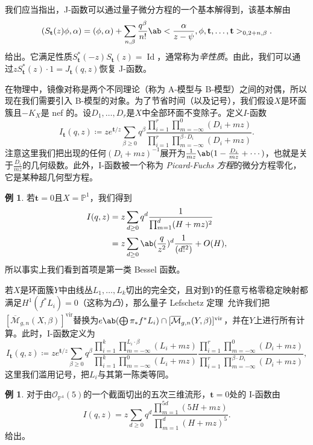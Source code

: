 \documentclass{amsart}
\theoremstyle{definition}
\newtheorem{exm}[thm]{例}
\theoremstyle{remark}
\theoremstyle{plain}
\theoremstyle{definition}
\theoremstyle{remark}
\renewcommand{\P}{\mathbb{P}}
\newcommand{\Mbar}{\overline{\mathcal{M}}}
\newcommand{\mc}[1]{\mathcal{#1}}
\newcommand{\mbf}[1]{\mathbf{#1}}
\newcommand{\mr}[1]{\mathrm{#1}}
\newcommand{\on}[1]{\operatorname{#1}}
\newcommand{\1}{\mathbf{1}}
\newcommand{\2}{\mathbf{2}}
\newcommand{\3}{\mathbf{3}}
\newcommand{\vir}{\mr{vir}}
\begin{document}
我们应当指出，J-函数可以通过量子微分方程的一个基本解得到，该基本解由
\[ ( S_{\mbf{t}}(z) \phi , \alpha) = (\phi, \alpha) + \sum_{n, \beta} \frac{q^{\beta}}{n!} \ab<\frac{\alpha}{z-\psi}, \phi, \mbf{t}, \ldots, \mbf{t}>_{0, 2+n, \beta}. \]
给出。它满足性质\(S_{\mbf{t}}^*(-z) S_{\mbf{t}}(z) = \on{Id}\)，通常称为\textit{辛性质}。由此，我们可以通过\(z S_{\mbf{t}}^*(z)\cdot 1 = J_{\mbf{t}}(q, z)\)恢复 J-函数。

在物理中，镜像对称是两个不同理论（称为 A-模型与 B-模型）之间的对偶，所以现在我们需要引入 B-模型的对象。为了节省时间（以及记号），我们假设\(X\)是环面簇且\(-K_X\)是 nef 的。设\(D_1, \ldots, D_r\)是\(X\)中全部环面不变除子。定义\(I\)-函数
\[
    I_{\mbf{t}}(q, z) \coloneqq z e^{\mbf{t}/z} \sum_{\beta \geq 0} q^{\beta} \frac{\prod_{i=1}^r \prod_{m = -\infty}^{0} (D_i + mz)}{\prod_{i=1}^r \prod_{m=-\infty}^{\beta \cdot D_i} (D_i + mz)}.
\]
注意这里我们把出现的任何\((D_i + mz)^{-1}\)展开为\(\frac{1}{mz} \ab(1 - \frac{D_i}{mz} + \cdots)\)，也就是关于\(\frac{D_i}{mz}\)的几何级数。此外，I-函数被一个称为 \textit{Picard-Fuchs 方程}的微分方程零化，它是某种超几何型方程。

\begin{exm}
    若\(\mbf{t} = 0\)且\(X = \P^1\)，我们得到
    \begin{align*}
        I(q,z) &= z\sum_{d \geq 0} q^d \frac{1}{\prod_{m=1}^d (H + mz)^2} \\
        &= z\sum_{d \geq 0} \ab(\frac{q}{z^2})^d \frac{1}{(d!^2)} + O(H),
    \end{align*}
    所以事实上我们看到首项是第一类 Bessel 函数。
\end{exm}

若\(X\)是环面簇\(Y\)中由线丛\(L_1, \ldots, L_k\)切出的完全交，且对到\(Y\)的任意亏格零稳定映射都满足\(H^1(f^* L_i) = 0\)（这称为\textit{凸}），那么量子 Lefschetz 定理~\cite{CoatesGivental2007}允许我们把\([\Mbar_{g,n}(X, \beta)]^{\vir}\)替换为\(e\ab(\bigoplus \pi_* f^* L_i) \cap [\Mbar_{g,n}(Y, \beta)]^{\vir}\)，并在\(Y\)上进行所有计算。此时，I-函数定义为
\[
    I_{\mbf{t}}(q,z) \coloneqq z e^{\mbf{t}/z} \sum_{\beta \geq 0} q^{\beta} \frac{\prod_{i=1}^k \prod_{m=-\infty}^{L_i \cdot \beta} (L_i + mz)}{\prod_{i=1}^k \prod_{m=-\infty}^{0} (L_i + mz)} \frac{\prod_{i=1}^r \prod_{m = -\infty}^{0} (D_i + mz)}{\prod_{i=1}^r \prod_{m=-\infty}^{\beta \cdot D_i} (D_i + mz)},
\]
这里我们滥用记号，把\(L_i\)与其第一陈类等同。

\begin{exm}
    对于由\(\mc{O}_{\P^4}(5)\)的一个截面切出的五次三维流形，\(\mbf{t} = 0\)处的 I-函数由
    \[ I(q,z) = z \sum_{d \geq 0} q^d \frac{\prod_{m=1}^{5d}(5H+mz)}{\prod_{m=1}^d (H+mz)^5}. \]
    给出。
\end{exm}
\end{document}
